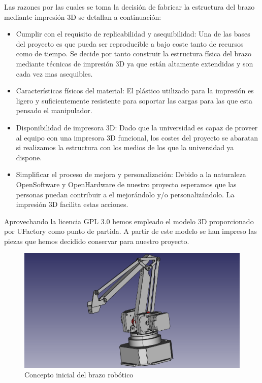 Las razones por las cuales se toma la decisión de fabricar la estructura del brazo mediante impresión 3D se detallan a continuación:

\begin{itemize}
  \item Cumplir con el requisito de replicabilidad y asequibilidad: Una de las bases del proyecto es que pueda ser reproducible a bajo coste tanto de recursos como de tiempo. Se decide por tanto construir la estructura física del brazo mediante técnicas de impresión 3D ya que están altamente extendidas y son cada vez mas asequibles.
  
  \item Características físicos del material: El plástico utilizado para la impresión es ligero y suficientemente resistente para soportar las cargas para las que esta pensado el manipulador.
  
  \item Disponibilidad de impresora 3D: Dado que la universidad es capaz de proveer al equipo con una impresora 3D funcional, los costes del proyecto se abaratan si realizamos la estructura con los medios de los que la universidad ya dispone.
  
  \item Simplificar el proceso de mejora y personalización: Debido a la naturaleza OpenSoftware y OpenHardware de nuestro proyecto esperamos que las personas puedan contribuir a el mejorándolo y/o personalizándolo. La impresión 3D facilita estas acciones.
\end{itemize}

Aprovechando la licencia GPL 3.0 hemos empleado el modelo 3D proporcionado por UFactory como punto de partida. A partir de este modelo se han impreso las piezas que hemos decidido conservar para nuestro proyecto.

\begin{figure}[H]
    \centering
    \includegraphics[width=12cm]{pictures/brazo_vista_3d_inicial.png}
    \caption{Concepto inicial del brazo robótico}
    \label{fig:manipulador_inicial}
\end{figure}

